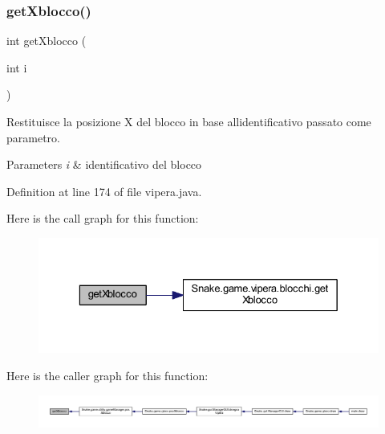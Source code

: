 \subsubsection{\texorpdfstring{get\+Xblocco()}{getXblocco()}}
{\footnotesize\ttfamily int get\+Xblocco (\begin{DoxyParamCaption}\item[{int}]{i }\end{DoxyParamCaption})}



Restituisce la posizione X del blocco in base all\textquotesingle{}identificativo passato come parametro. 


\begin{DoxyParams}{Parameters}
{\em i} & identificativo del blocco \\
\hline
\end{DoxyParams}


Definition at line 174 of file vipera.\+java.

Here is the call graph for this function\+:
\nopagebreak
\begin{figure}[H]
\begin{center}
\leavevmode
\includegraphics[width=329pt]{class_snake_1_1game_1_1vipera_1_1vipera_ac25c5b310cb26c05d5ea69485d1e155f_cgraph}
\end{center}
\end{figure}
Here is the caller graph for this function\+:
\nopagebreak
\begin{figure}[H]
\begin{center}
\leavevmode
\includegraphics[width=350pt]{class_snake_1_1game_1_1vipera_1_1vipera_ac25c5b310cb26c05d5ea69485d1e155f_icgraph}
\end{center}
\end{figure}
\mbox{\label{class_snake_1_1game_1_1vipera_1_1vipera_aab81944f0a14bba932c0931899951937}} 

